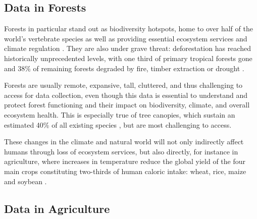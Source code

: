 
\subsection{Data in Forests}

Forests in particular stand out as biodiversity hotspots, home to over half of the world's vertebrate species \cite{Pillay2022} as well as providing essential ecosystem services and climate regulation \cite{Brockerhoff2017}. They are also under grave threat: deforestation has reached historically unprecedented levels, with one third of primary tropical forests gone \cite{Krogh2021} and 38\% of remaining forests degraded by fire, timber extraction or drought \cite{Lapola2023}.

Forests are usually remote, expansive, tall, cluttered, and thus challenging to access for data collection, even though this data is essential to understand and protect forest functioning and their impact on biodiversity, climate, and overall ecosystem health. This is especially true of tree canopies, which sustain an estimated 40\% of all existing species \cite{Ozanne2003d}, but are most challenging to access.

These changes in the climate and natural world will not only indirectly affect humans through loss of ecosystem services, but also directly, for instance in agriculture, where increases in temperature reduce the global yield of the four main crops constituting two-thirds of human caloric intake: wheat, rice, maize and soybean \cite{Zhao2017}.

\subsection{Data in Agriculture}

